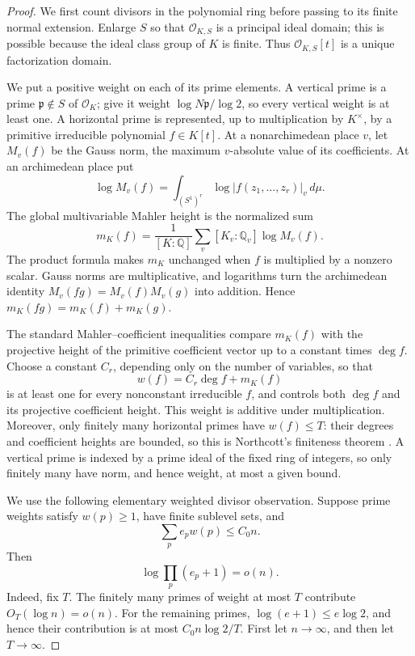 \documentclass[11pt,reqno]{amsart}
\theoremstyle{definition}
\theoremstyle{remark}
\newcommand{\Q}{\mathbb Q}
\newcommand{\cO}{\mathcal O}
\begin{document}
\begin{proof}
We first count divisors in the polynomial ring before passing to its finite
normal extension.  Enlarge \(S\) so that \(\cO_{K,S}\) is a principal ideal
domain; this is possible because the ideal class group of \(K\) is finite.
Thus \(\cO_{K,S}[t]\) is a unique factorization domain.

We put a positive weight on each of its prime elements.  A vertical prime
is a prime \(\mathfrak p\notin S\) of \(\cO_K\); give it weight
\(\log N\mathfrak p/\log 2\), so every vertical weight is at least one.
A horizontal prime is represented, up to
multiplication by \(K^\times\), by a primitive irreducible polynomial
\(f\in K[t]\).  At a nonarchimedean place \(v\), let \(M_v(f)\) be the
Gauss norm, the maximum \(v\)-absolute value of its coefficients.  At an
archimedean place put
\[
 \log M_v(f)=
 \int_{(S^1)^r}\log|f(z_1,\ldots,z_r)|_v\,d\mu.
\]
The global multivariable Mahler height is the normalized sum
\[
 m_K(f)=\frac1{[K:\Q]}\sum_v [K_v:\Q_v]\log M_v(f).
\]
The product formula makes \(m_K\) unchanged when \(f\) is multiplied by a
nonzero scalar.  Gauss norms are multiplicative, and logarithms turn the
archimedean identity \(M_v(fg)=M_v(f)M_v(g)\) into addition.  Hence
\(m_K(fg)=m_K(f)+m_K(g)\).

The standard Mahler--coefficient inequalities compare \(m_K(f)\) with the
projective height of the primitive coefficient vector up to a constant times
\(\deg f\).  Choose a constant \(C_r\), depending only on the number of
variables, so that
\[
 w(f)=C_r\deg f+m_K(f)
\]
is at least one for every nonconstant irreducible \(f\), and controls both
\(\deg f\) and its projective coefficient height.  This weight is additive
under multiplication.  Moreover, only finitely many horizontal primes have
\(w(f)\le T\): their degrees and coefficient heights are bounded, so this is
Northcott's finiteness theorem
\cite[Theorem~1.6.8]{BombieriGubler}.  A vertical prime is indexed by a
prime ideal of the fixed ring of integers, so only finitely many have norm,
and hence weight, at most a given bound.

We use the following elementary weighted divisor observation.  Suppose prime
weights satisfy \(w(p)\ge1\), have finite sublevel sets, and
\[
 \sum_p e_p w(p)\le C_0n.
\]
Then
\[
 \log\prod_p(e_p+1)=o(n).
\tag{12.3}
\]
Indeed, fix \(T\).  The finitely many primes of weight at most \(T\)
contribute \(O_T(\log n)=o(n)\).  For the remaining primes,
\(\log(e+1)\le e\log2\), and hence their contribution is at most
\(C_0n\log2/T\).  First let \(n\to\infty\), and then let \(T\to\infty\).


\end{proof}
\end{document}
